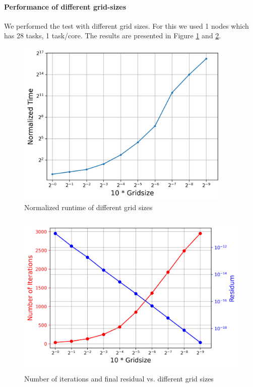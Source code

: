 \documentclass[article]{scrartcl}
\begin{document}
\paragraph{Performance of different grid-sizes}
We performed the test with different grid sizes. For this we used 1 nodes which has 28 tasks, 1 task/core. The results are presented in Figure \ref{fig:grid1} and \ref{fig:grid2}. 

\begin{figure}[htpb]
  \centering
  \includegraphics[width=\textwidth,height=8cm,keepaspectratio=true]{../figs/5_gridsizes_1.png}
  \caption{Normalized runtime of different grid sizes}
  \label{fig:grid1}
\end{figure}
\begin{figure}[htpb]
  \centering
  \includegraphics[width=\textwidth,height=8cm,keepaspectratio=true]{../figs/5_gridsizes_2.png}
  \caption{Number of iterations and final residual vs. different grid sizes}
  \label{fig:grid2}
\end{figure}
\end{document}
